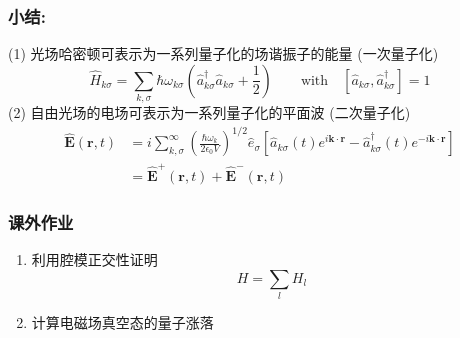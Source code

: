 \begin{frame} 
\frametitle{小结:}
  (1) 光场哈密顿可表示为一系列量子化的场谐振子的能量 (一次量子化)
  \[ \hat{H}_{k\sigma}= \sum_{k,\sigma}\hbar \omega_{k\sigma} \left(\hat{a}^\dagger _{k\sigma} \hat{a} _{k\sigma}+ \frac{1 }{2}\right) \qquad \text{with} \quad [\hat{a} _{k\sigma},\hat{a}^\dagger _{k\sigma}]=1 \]
  (2) 自由光场的电场可表示为一系列量子化的平面波 (二次量子化)
  \[\begin{aligned}
    \hat{\mathbf{E}} (\mathbf{r},t) &=i \sum^\infty _{k,\sigma} (\frac{\hbar\omega_k}{2 \epsilon_0 V } )^{1/2} \hat{e}_\sigma \left[ \hat{a} _{k\sigma} (t) e^{i \mathbf{k}\cdot \mathbf{r}} - \hat{a} ^\dagger _{k\sigma} (t)  e^{-i \mathbf{k}\cdot \mathbf{r}}\right] \\
    &= \hat{\mathbf{E}}^+(\mathbf{r},t)+ \hat{\mathbf{E}}^-(\mathbf{r},t)
  \end{aligned} \]
\end{frame}
\begin{frame}
    \frametitle{课外作业}
    \begin{enumerate}
        \item  利用腔模正交性证明 \[ H= \sum_l H_l\]
        \item  计算电磁场真空态的量子涨落
    \end{enumerate}
\end{frame}
